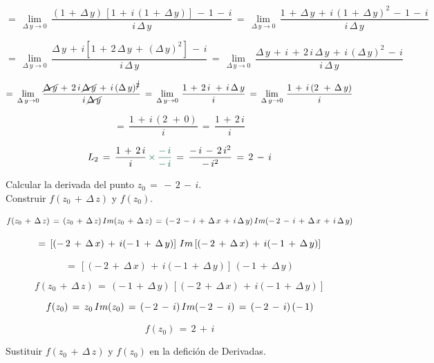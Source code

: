 \documentclass[a4paper,11pt,openany]{book}
\begin{document}
$$=\,\displaystyle\lim_{\Delta\,y \to 0}\,\dfrac{(1\,+\,\Delta\,y)\,\left[1\,+\,i\,(1\,+\,\Delta\,y)\right]\,-\,1\,-\,i}{i\,\Delta\,y}\,=\,\displaystyle\lim_{\Delta\,y \to 0}\,\dfrac{1\,+\,\Delta\,y\,+\,i\,(1\,+\,\Delta\,y)^{2}\,-\,1\,-\,i}{i\,\Delta\,y}$$

$$=\,\displaystyle\lim_{\Delta\,y \to 0}\,\dfrac{\Delta\,y\,+\,i[1\,+\,2\,\Delta\,y\,+\,(\Delta\,y)^{2}]\,-\,i}{i\,\Delta\,y}\,=\,\displaystyle\lim_{\Delta\,y \to 0}\,\dfrac{\Delta\,y\,+\,i\,+\,2\,i\,\Delta\,y\,+\,i\,(\Delta\,y)^{2}\,-\,i}{i\,\Delta\,y}$$

$$=\,\displaystyle\lim_{\Delta\,y \to 0}\,\dfrac{\cancel{\Delta\,y}\,+\,2\,i\,\cancel{\Delta\,y}\,+\,i\,(\Delta\,y)^{\cancel{2}}}{i\,\cancel{\Delta\,y}}\,=\,\displaystyle\lim_{\Delta\,y \to 0}\,\dfrac{1\,+\,2\,i\,\,+\,i\,\Delta\,y}{i}\,=\,\displaystyle\lim_{\Delta\,y \to 0}\,\dfrac{1\,+\,i\,(2\,\,+\,\Delta\,y)}{i}$$

$$=\,\dfrac{1\,+\,i\,(2\,\,+\,0)}{i}\,=\,\dfrac{1\,+\,2\,i}{i}$$

$$L_{2}\,=\,\dfrac{1\,+\,2\,i}{i}\,\textcolor{cadmiumgreen}{\times\,\dfrac{-\,i}{-\,i}}\,=\,\dfrac{-\,i\,-\,2\,i^{2}}{-\,i^{2}}\,=\,2\,-\,i$$

\textcolor{ao(english)}{} Calcular la derivada del punto $z_{0}\,=\,-\,2\,-\,i$.\\

\textcolor{ao(english)}{} Construir $f(z_{0}\,+\,\Delta\,z)$ y $f(z_{0})$.

$$f(z_{0}\,+\,\Delta\,z)\,=\,(z_{0}\,+\,\Delta\,z)\,\mathnormal{Im}(z_{0}\,+\,\Delta\,z)\,=\,(-\,2\,-\,i\,+\,\Delta\,x\,+\,i\,\Delta\,y)\,\mathnormal{Im}(-\,2\,-\,i\,+\,\Delta\,x\,+\,i\,\Delta\,y)$$

$$=\,\left[(-\,2\,+\,\Delta\,x)\,+\,i(-\,1\,+\,\Delta\,y)\right]\,\mathnormal{Im}\left[(-\,2\,+\,\Delta\,x)\,+\,i(-\,1\,+\,\Delta\,y)\right]$$

$$=\,\left[(-\,2\,+\,\Delta\,x)\,+\,i(-\,1\,+\,\Delta\,y)\right]\,(-\,1\,+\,\Delta\,y)$$

$$f(z_{0}\,+\,\Delta\,z)\,=\,(-\,1\,+\,\Delta\,y)\,\left[(-\,2\,+\,\Delta\,x)\,+\,i(-\,1\,+\,\Delta\,y)\right]$$

$$f(z_{0})\,=\,z_{0}\,\mathnormal{Im}(z_{0})\,=\,(-\,2\,-\,i)\,\mathnormal{Im}(-\,2\,-\,i)\,=\,(-\,2\,-\,i)\,(-\,1)$$

$$f(z_{0})\,=\,2\,+\,i$$

\textcolor{ao(english)}{} Sustituir  $f(z_{0}\,+\,\Delta\,z)$ y $f(z_{0})$ en la defición de Derivadas.
\end{document}
